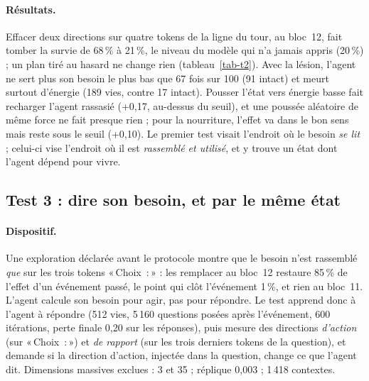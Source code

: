 \documentclass[11pt,a4paper]{article}
\newcommand{\Choix}{«\,Choix~:\,»}
\begin{document}
\paragraph{Résultats.} Effacer deux directions sur quatre tokens de la ligne du
tour, au bloc~12, fait tomber la survie de 68\,\% à 21\,\%, le niveau du modèle qui
n'a jamais appris (20\,\%) ; un plan tiré au hasard ne change rien
(tableau~\ref{tab-t2}). Avec la lésion, l'agent ne sert plus son besoin le plus bas
que 67 fois sur 100 (91 intact) et meurt surtout d'énergie (189 vies, contre 17
intact). Pousser l'état vers \og énergie basse \fg{} fait recharger l'agent
rassasié (+0,17, au-dessus du seuil), et une poussée aléatoire de même force ne
fait presque rien ; pour la nourriture, l'effet va dans le bon sens mais reste
sous le seuil (+0,10). Le premier test visait l'endroit où le besoin \emph{se lit} ;
celui-ci vise l'endroit où il est \emph{rassemblé et utilisé}, et y trouve un état
dont l'agent dépend pour vivre.

\subsection{Test 3 : dire son besoin, et par le même état}
\label{sec-t3}

\paragraph{Dispositif.} Une exploration déclarée avant le protocole montre que le
besoin n'est rassemblé \emph{que} sur les trois tokens \Choix{} : les remplacer au
bloc~12 restaure 85\,\% de l'effet d'un événement passé, le point qui clôt
l'événement 1\,\%, et rien au bloc~11. L'agent calcule son besoin pour agir, pas
pour répondre. Le test apprend donc à l'agent à répondre (512 vies, 5\,160
questions posées après l'événement, 600 itérations, perte finale 0,20 sur les
réponses), puis mesure des directions \emph{d'action} (sur \Choix{}) et \emph{de
rapport} (sur les trois derniers tokens de la question), et demande si la
direction d'action, injectée dans la question, change ce que l'agent dit.
Dimensions massives exclues : 3 et 35 ; réplique 0,003 ; 1\,418 contextes.
\end{document}
